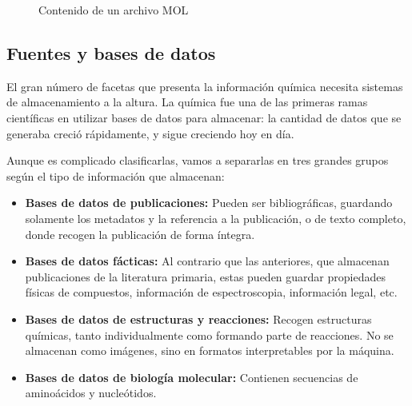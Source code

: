 \begin{figure}[H]
\centering
    \caption{Contenido de un archivo MOL \cite{molfile_example}} 
\end{figure}


\subsection{Fuentes y bases de datos}

El gran número de facetas que presenta la información química necesita sistemas de almacenamiento a la altura. La química fue una de las primeras ramas científicas en utilizar bases de datos para almacenar: la cantidad de datos que se generaba creció rápidamente, y sigue creciendo hoy en día. 

Aunque es complicado clasificarlas, vamos a separarlas en tres grandes grupos según el tipo de información que almacenan: \cite{doi:10.1021/ci600234z}
\begin{itemize}
    \item \textbf{Bases de datos de publicaciones:} Pueden ser bibliográficas, guardando solamente los metadatos y la referencia a la publicación, o de texto completo, donde recogen la publicación de forma íntegra. %
    \item \textbf{Bases de datos fácticas:} Al contrario que las anteriores, que almacenan publicaciones de la literatura primaria, estas pueden guardar propiedades físicas de compuestos, información de espectroscopia, información legal, etc.
    \item \textbf{Bases de datos de estructuras y reacciones:} Recogen estructuras químicas, tanto individualmente como formando parte de reacciones. No se almacenan como imágenes, sino en formatos interpretables por la máquina.
    \item \textbf{Bases de datos de biología molecular:} Contienen secuencias de aminoácidos y nucleótidos.
\end{itemize}

